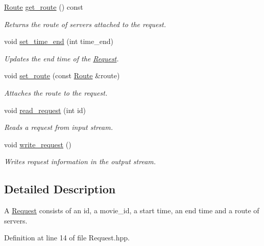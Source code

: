 \begin{DoxyCompactItemize}
\hyperlink{class_route}{Route} \hyperlink{class_request_aeb33aab0cad4e8a31dae47ec2835d88a}{get\_\-route} () const 
\begin{DoxyCompactList}\small\item\em Returns the route of servers attached to the request. \item\end{DoxyCompactList}\item 
void \hyperlink{class_request_ad11cd0ae5c2fbf75ed0af3a9fabec6c3}{set\_\-time\_\-end} (int time\_\-end)
\begin{DoxyCompactList}\small\item\em Updates the end time of the \hyperlink{class_request}{Request}. \item\end{DoxyCompactList}\item 
void \hyperlink{class_request_a13116660438837d356978f3732be1fc6}{set\_\-route} (const \hyperlink{class_route}{Route} \&route)
\begin{DoxyCompactList}\small\item\em Attaches the route to the request. \item\end{DoxyCompactList}\item 
void \hyperlink{class_request_a8dbd0625831bd993f8ab038bbad11c0c}{read\_\-request} (int id)
\begin{DoxyCompactList}\small\item\em Reads a request from input stream. \item\end{DoxyCompactList}\item 
void \hyperlink{class_request_ac3648ea8be667941c55018428cf469ed}{write\_\-request} ()
\begin{DoxyCompactList}\small\item\em Writes request information in the output stream. \item\end{DoxyCompactList}\end{DoxyCompactItemize}


\subsection{Detailed Description}
A \hyperlink{class_request}{Request} consists of an id, a movie\_\-id, a start time, an end time and a route of servers. 

Definition at line 14 of file Request.hpp.



